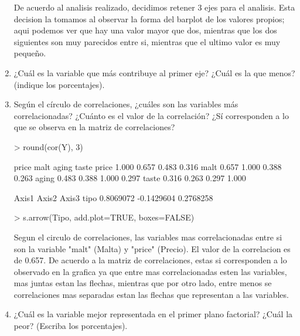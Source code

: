 \documentclass[letterpaper, 12pt]{article}
\begin{document}
\begin{enumerate}
        De acuerdo al analisis realizado, decidimos retener 3 ejes para el
        analisis. Esta decision la tomamos al observar la forma del barplot de
        los valores propios; aqui podemos ver que hay una valor mayor que dos,
        mientras que los dos siguientes son muy parecidos entre si, mientras que
        el ultimo valor es muy pequeño.\\
      
        \item ¿Cuál es la variable que más contribuye al primer eje? ¿Cuál 
        es la que menos? (indique los porcentajes).
        
        \item Según el círculo de correlaciones, ¿cuáles son las variables 
        más correlacionadas? ¿Cuánto es el valor de la correlación? ¿Sí 
        corresponden a lo que se observa en la matriz de correlaciones?
        
\begin{Schunk}
\begin{Sinput}
> round(cor(Y), 3)
\end{Sinput}
\begin{Soutput}
      price  malt aging taste
price 1.000 0.657 0.483 0.316
malt  0.657 1.000 0.388 0.263
aging 0.483 0.388 1.000 0.297
taste 0.316 0.263 0.297 1.000
\end{Soutput}
\begin{Soutput}
         Axis1      Axis2     Axis3
tipo 0.8069072 -0.1429604 0.2768258
\end{Soutput}
\begin{Sinput}
> s.arrow(Tipo, add.plot=TRUE, boxes=FALSE)
\end{Sinput}
\end{Schunk}
        Segun el circulo de correlaciones, las variables mas correlacionadas entre
        si son la variable "malt" (Malta) y "price" (Precio). El valor de la
        correlacion es de 0.657. De acuerdo a la matriz de correlaciones, estas
        si corresponden a lo observado en la grafica ya que entre mas correlacionadas
        esten las variables, mas juntas estan las flechas, mientras que por otro 
        lado, entre menos se correlaciones mas separadas estan las flechas que
        representan a las variables.
        
        \item ¿Cuál es la variable mejor representada en el primer plano 
        factorial? ¿Cuál la peor? (Escriba los porcentajes).
        

\end{enumerate}
\end{document}
